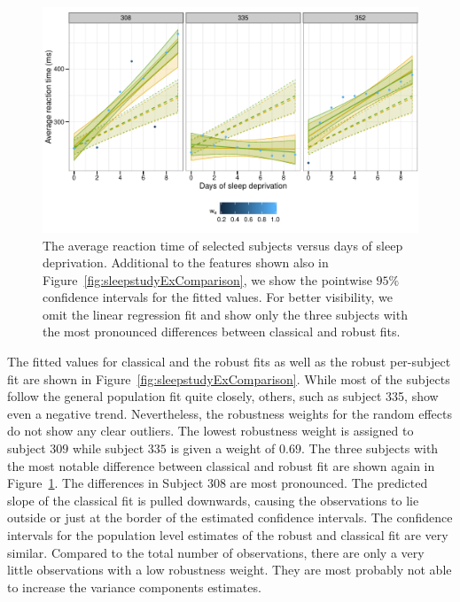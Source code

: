 \documentclass[11pt, a4paper]{article}
\theoremstyle{note}
\begin{document}
\begin{figure}[htb]
  \centering
  \includegraphics{figs/fig-ex-sleepstudy-ex-comparsion-subsample}
  \caption{The average reaction time of selected subjects versus days of sleep
    deprivation. Additional to the features shown also in
    Figure~\ref{fig:sleepstudyExComparison}, we show the pointwise
    $95\%$ confidence intervals for the fitted values. For better
    visibility, we omit the linear regression fit and show only the three
    subjects with the most pronounced differences between classical and
    robust fits.}
  \label{fig:sleepstudyExComparisonSubsample}
\end{figure}

The fitted values for classical and the robust fits as well as the robust
per-subject fit are shown in Figure~\ref{fig:sleepstudyExComparison}. While
most of the subjects follow the general population fit quite closely,
others, such as subject 335, show even a negative trend. Nevertheless, the
robustness weights for the random effects do not show any clear
outliers. The lowest robustness weight is assigned to subject
$309$ while subject $335$ is given a weight of
$0.69$. The three subjects with the most notable
difference between classical and robust fit are shown again in
Figure~\ref{fig:sleepstudyExComparisonSubsample}. The differences in
Subject $308$ are most pronounced. The predicted slope of the classical fit
is pulled downwards, causing the observations to lie outside or just at the
border of the estimated confidence intervals. The confidence intervals for
the population level estimates of the robust and classical fit are very
similar. Compared to the total number of observations, there are only a
very little observations with a low robustness weight. They are most
probably not able to increase the variance components estimates.
\end{document}
